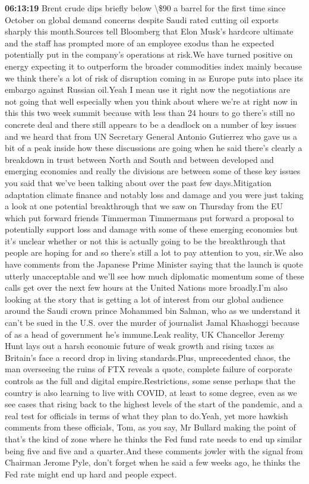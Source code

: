 \documentclass{article}%
\begin{document}
\textbf{06:13:19}%
\newline%
Brent crude dips briefly below \textbackslash{}\$90 a barrel for the first time since October on global demand concerns despite Saudi rated cutting oil exports sharply this month.Sources tell Bloomberg that Elon Musk's hardcore ultimate and the staff has prompted more of an employee exodus than he expected potentially put in the company's operations at risk.We have turned positive on energy expecting it to outperform the broader commodities index mainly because we think there's a lot of risk of disruption coming in as Europe puts into place its embargo against Russian oil.Yeah I mean use it right now the negotiations are not going that well especially when you think about where we're at right now in this this two week summit because with less than 24 hours to go there's still no concrete deal and there still appears to be a deadlock on a number of key issues and we heard that from UN Secretary General Antonio Gutierrez who gave us a bit of a peak inside how these discussions are going when he said there's clearly a breakdown in trust between North and South and between developed and emerging economies and really the divisions are between some of these key issues you said that we've been talking about over the past few days.Mitigation adaptation climate finance and notably loss and damage and you were just taking a look at one potential breakthrough that we saw on Thursday from the EU which put forward friends Timmerman Timmermans put forward a proposal to potentially support loss and damage with some of these emerging economies but it's unclear whether or not this is actually going to be the breakthrough that people are hoping for and so there's still a lot to pay attention to you, sir.We also have comments from the Japanese Prime Minister saying that the launch is quote utterly unacceptable and we'll see how much diplomatic momentum some of these calls get over the next few hours at the United Nations more broadly.I'm also looking at the story that is getting a lot of interest from our global audience around the Saudi crown prince Mohammed bin Salman, who as we understand it can't be sued in the U.S. over the murder of journalist Jamal Khashoggi because of as a head of government he's immune.Leak reality, UK Chancellor Jeremy Hunt lays out a harsh economic future of weak growth and rising taxes as Britain's face a record drop in living standards.Plus, unprecedented chaos, the man overseeing the ruins of FTX reveals a quote, complete failure of corporate controls as the full and digital empire.Restrictions, some sense perhaps that the country is also learning to live with COVID, at least to some degree, even as we see cases that rising back to the highest levels of the start of the pandemic, and a real test for officials in terms of what they plan to do.Yeah, yet more hawkish comments from these officials, Tom, as you say, Mr Bullard making the point of that's the kind of zone where he thinks the Fed fund rate needs to end up similar being five and five and a quarter.And these comments jowler with the signal from Chairman Jerome Pyle, don't forget when he said a few weeks ago, he thinks the Fed rate might end up hard and people expect.%
\end{document}
